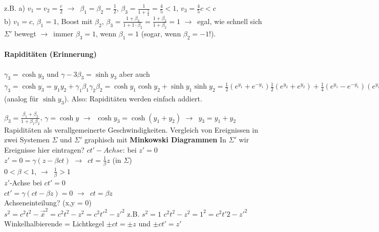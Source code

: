 \documentclass[oneside]{book}
\theoremstyle{definition}
\newcommand{\conseq}{$\rightarrow$~}
\begin{document}
z.B. a) $v_1 = v_2 = \frac{c}{2}$ \conseq $\beta_1 = \beta_2 = \frac12$, $\beta_3 = \frac{1}{1 + \frac14} = \frac45 < 1$, $v_3 = \frac45 c < c$\\
b) $v_1 = c$, $\beta_1 = 1$, Boost mit $\beta_2$, $\beta_3 = \frac{1 + \beta_2}{1 + 1 \cdot \beta_2} = \frac{1 + \beta_2}{1 + \beta_2} = 1$ \conseq egal, wie schnell sich $\Sigma'$ bewegt \conseq immer $\beta_3 = 1$, wenn $\beta_1 = 1$ (sogar, wenn $\beta_2 = -1$!).

\paragraph{Rapiditäten (Erinnerung)} $\gamma_3 = \cosh y_3$ und $\gamma-3 \beta_3 = \sinh y_3$
aber auch $\gamma_3 = \cosh y_3 = y_1 y_2 + \gamma_1 \beta_1 \gamma_2 \beta_2 = \cosh y_1 \cosh y_2 + \sinh y_1 \sinh y_2 = \frac12 (e^{y_1} + e^{-y_1}) \frac12 (e^{y_2} + e^{y_2}) + \frac14 (e^{y_1} - e^{- y_1}) (e^{y_2} - e^{-y_2}) = \frac14 (e^{y_1} e^{y_2} + e^{y_1} e^{-y_2} + e^{-y_1} e^{y_2} + e^{-y_1} e^{-y_2} + e^{y_1} e^{y_2} - e^{y_1} e^{-y_2} - e^{-y_1} e^{y_2} - e^{-y_1} e^{-y_2}) = \frac14 (2 e^{y_1} e^{y_2} + 2 e^{-y_1} e^{-y_2}) = \frac12 (e^{y_1 + y_2} + e^{-(y_1 + y_2)}) = \cosh (y_1 + y_2) = \cosh y_3$ (analog für $\sinh y_3$). Also: Rapiditäten werden einfach addiert.


$\beta_3 = \frac{\beta_1 + \beta_2}{1 + \beta_1 \beta_2}$, $\gamma = \cosh y$ \conseq $\cosh y_3 = \cosh(y_1 + y_2)$ \conseq $y_3 = y_1 + y_2$ Rapiditäten als verallgemeinerte Geschwindigkeiten. Vergleich von Ereignissen in zwei Systemen $\Sigma$ und $\Sigma'$ graphisch mit \textbf{Minkowski Diagrammen}
In $\Sigma'$ wir Ereignisse hier eintragen?
$ct'-Achse$: bei $z' = 0$\\

$z' = 0 = \gamma (z - \beta c t)$ \conseq $ct = \frac{1}{\beta} z$ (in $\Sigma$)\\
$0 < \beta < 1$, \conseq $\frac{1}{\beta} > 1$\\

$z'$-Achse bei $ct' = 0$\\

$c t' = \gamma (ct - \beta z) = 0$ \conseq $ct = \beta z$\\

Achseneinteilung? (x,y = 0)\\
$s^2 = c^2 t^2 - \vec{x}^2 = c^2 t^2 - z^2 = c^2 {t'}^2 - z'^2$ 
z.B. $s^2 = 1$
$c^2 t^2 - z^2 = 1^2 = c^2 t'2 - z'^2$\\
Winkelhalbierende = Lichtkegel $\pm ct = \pm z$ und $\pm c t' = z'$
\end{document}

